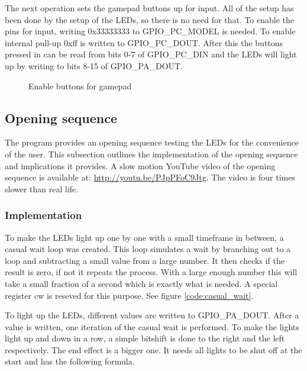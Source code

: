 The next operation sets the gamepad buttons up for input. All of the setup has been done by the setup of the LEDs, so there is no need for that. To enable the pins for input, writing 0x33333333 to GPIO\_PC\_MODEL is needed. To enable internal pull-up 0xff is written to GPIO\_PC\_DOUT. After this the buttons pressed in can be read from bits 0-7 of GPIO\_PC\_DIN and the LEDs will light up by writing to bits 8-15 of GPIO\_PA\_DOUT.

\begin{figure}[h!]
\caption{Enable buttons for gamepad}
\label{code:set_drive_gpio_o}
\end{figure}

\subsection{Opening sequence}
\label{subsec:dev_pros_opening_seq}

The program provides an opening sequence testing the LEDs for the convenience of the user. This subsection outlines the implementation of the opening sequence and implications it provides. A slow motion YouTube video of the opening sequence is available at: \url{http://youtu.be/PJpPFoC9Jtg}. The video is four times slower than real life.

\subsubsection{Implementation}

To make the LEDs light up one by one with a small timeframe in between, a casual wait loop was created. This loop simulates a wait by branching out to a loop and subtracting a small value from a large number. It then checks if the result is zero, if not it repeats the process. With a large enough number this will take a small fraction of a second which is exactly what is needed. A special register cw is reseved for this purpose. See figure \ref{code:casual_wait}.

To light up the LEDs, different values are written to GPIO\_PA\_DOUT. After a value is written, one iteration of the casual wait is performed. To make the lights light up and down in a row, a simple bitshift is done to the right and the left respectively. The end effect is a bigger one. It needs all lights to be shut off at the start and has the following formula.

